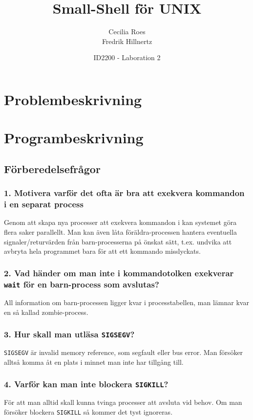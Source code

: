 \documentclass[a4paper]{article}
\title{Small-Shell för UNIX}
\date{ID2200 - Laboration 2}
\author{Cecilia Roes \\ Fredrik Hillnertz}
\begin{document}

\maketitle

\section*{Problembeskrivning}

\section*{Programbeskrivning}

\subsection*{Förberedelsefrågor}
\subsubsection*{1. Motivera varför det ofta är bra att exekvera kommandon i en separat process}
Genom att skapa nya processer att exekvera kommandon i kan systemet göra flera saker parallellt. Man kan även låta föräldra-processen hantera eventuella signaler/returvärden från barn-processerna på önskat sätt, t.ex. undvika att avbryta hela programmet bara för att ett kommando misslyckats.

\subsubsection*{2. Vad händer om man inte i kommandotolken exekverar \texttt{wait} för en barn-process som avslutas?}
All information om barn-processen ligger kvar i processtabellen, man lämnar kvar en så kallad zombie-process.

\subsubsection*{3. Hur skall man utläsa \texttt{SIGSEGV}?}
\texttt{SIGSEGV} är invalid memory reference, som segfault eller bus error. Man försöker alltså komma åt en plats i minnet man inte har tillgång till.

\subsubsection*{4. Varför kan man inte blockera \texttt{SIGKILL}?}
För att man alltid skall kunna tvinga processer att avsluta vid behov. Om man försöker blockera \texttt{SIGKILL} så kommer det tyst ignoreras.
\end{document}
